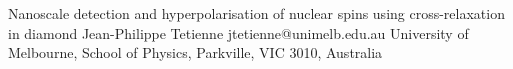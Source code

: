 \begin{conf-abstract}[]
{Nanoscale detection and hyperpolarisation of nuclear spins using cross-relaxation in diamond}
{Jean-Philippe Tetienne}
{jtetienne@unimelb.edu.au}
{University of Melbourne, School of Physics, Parkville, VIC 3010,  Australia}
{\\}





\printbibliography[heading=none]

\end{conf-abstract}
